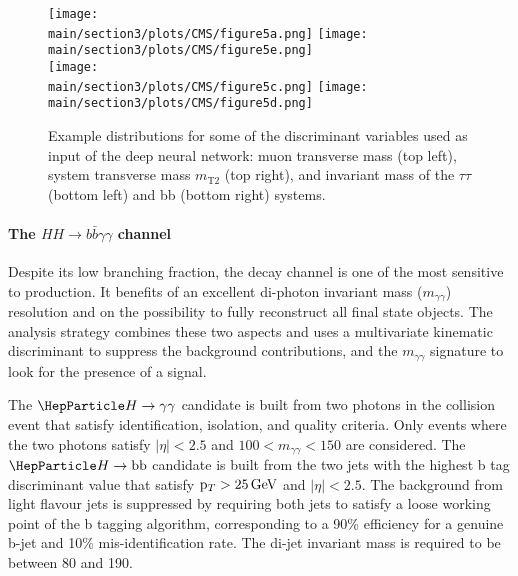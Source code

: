 \begin{figure}[!htb]
\centering 
    \texttt{[image: \\main/section3/plots/CMS/figure5a.png]}
    \texttt{[image: \\main/section3/plots/CMS/figure5e.png]}\\
    \texttt{[image: \\main/section3/plots/CMS/figure5c.png]}
    \texttt{[image: \\main/section3/plots/CMS/figure5d.png]}\\    
\caption{Example distributions for some of the discriminant variables used as input of the \bbtt deep neural network: muon transverse mass (top left), system transverse mass $m_\text{T2}$ (top right), and invariant mass of the $\tau\tau$ (bottom left) and bb (bottom right) systems.} 
\label{sec3:CMSHH:fig:bbttinputs} 
\end{figure}


\paragraph{The $HH \rightarrow b\bar{b}\gamma\gamma$ channel}

Despite its low branching fraction, the \bbgg decay channel is one of the most sensitive to \HH production.
It benefits of an excellent di-photon invariant mass ($m_{\gamma\gamma}$) resolution and on the possibility to fully reconstruct all final state objects.
The analysis strategy combines these two aspects and uses a multivariate kinematic discriminant to suppress the background contributions, and the $m_{\gamma\gamma}$ signature to look for the presence of a signal.

The $\PH\to\gamma\gamma$ candidate is built from two photons in the collision event that satisfy identification, isolation, and quality criteria.
Only events where the two photons satisfy $|\eta| < 2.5$ and $100 < m_{\gamma\gamma} < 150$ are considered.
The $\PH\to\text{bb}$ candidate is built from the two jets with the highest b tag discriminant value that satisfy $\mathrm{p}_{T} > 25\,\text{Ge\hspace{-.08em}V}$ and $|\eta| < 2.5$.
The background from light flavour jets is suppressed by requiring both jets to satisfy a loose working point of the  b tagging algorithm, corresponding to a 90\% efficiency for a genuine b-jet and 10\% mis-identification rate.
The di-jet invariant mass is required to be between 80 and 190\GeV. 

